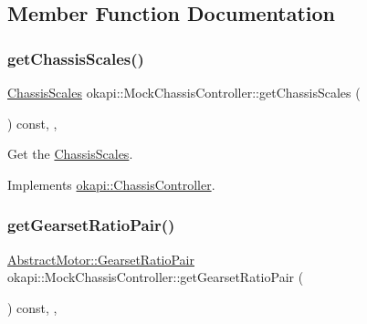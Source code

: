 \subsection{Member Function Documentation}
\mbox{\label{classokapi_1_1MockChassisController_af5ce0b173f42ae48fb70f39eb986e781}} 
\subsubsection{\texorpdfstring{getChassisScales()}{getChassisScales()}}
{\footnotesize\ttfamily \mbox{\hyperlink{classokapi_1_1ChassisScales}{Chassis\+Scales}} okapi\+::\+Mock\+Chassis\+Controller\+::get\+Chassis\+Scales (\begin{DoxyParamCaption}{ }\end{DoxyParamCaption}) const\hspace{0.3cm}{\ttfamily [inline]}, {\ttfamily [override]}, {\ttfamily [virtual]}}



Get the \mbox{\hyperlink{classokapi_1_1ChassisScales}{Chassis\+Scales}}. 



Implements \mbox{\hyperlink{classokapi_1_1ChassisController_a0a8e32fc7adad8567f550954505aaa06}{okapi\+::\+Chassis\+Controller}}.

\mbox{\label{classokapi_1_1MockChassisController_a78359e0cc41856703fe9b0d3dc414b13}} 
\subsubsection{\texorpdfstring{getGearsetRatioPair()}{getGearsetRatioPair()}}
{\footnotesize\ttfamily \mbox{\hyperlink{structokapi_1_1AbstractMotor_1_1GearsetRatioPair}{Abstract\+Motor\+::\+Gearset\+Ratio\+Pair}} okapi\+::\+Mock\+Chassis\+Controller\+::get\+Gearset\+Ratio\+Pair (\begin{DoxyParamCaption}{ }\end{DoxyParamCaption}) const\hspace{0.3cm}{\ttfamily [inline]}, {\ttfamily [override]}, {\ttfamily [virtual]}}




